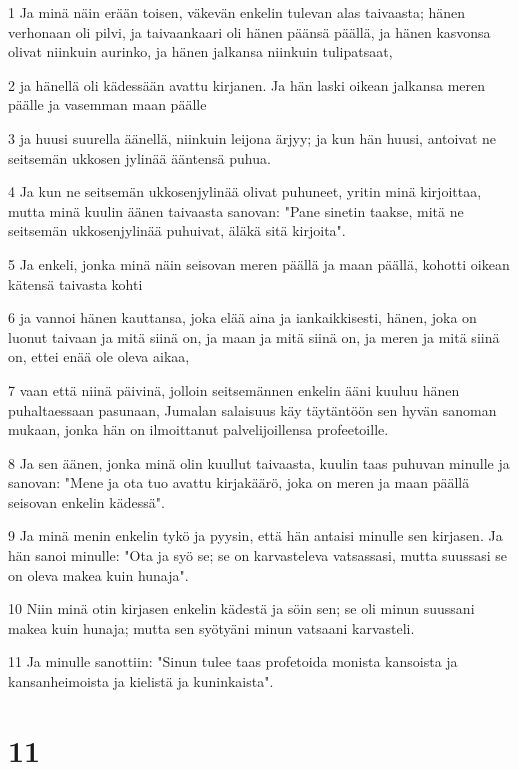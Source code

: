 \par 1 Ja minä näin erään toisen, väkevän enkelin tulevan alas taivaasta; hänen verhonaan oli pilvi, ja taivaankaari oli hänen päänsä päällä, ja hänen kasvonsa olivat niinkuin aurinko, ja hänen jalkansa niinkuin tulipatsaat,
\par 2 ja hänellä oli kädessään avattu kirjanen. Ja hän laski oikean jalkansa meren päälle ja vasemman maan päälle
\par 3 ja huusi suurella äänellä, niinkuin leijona ärjyy; ja kun hän huusi, antoivat ne seitsemän ukkosen jylinää ääntensä puhua.
\par 4 Ja kun ne seitsemän ukkosenjylinää olivat puhuneet, yritin minä kirjoittaa, mutta minä kuulin äänen taivaasta sanovan: "Pane sinetin taakse, mitä ne seitsemän ukkosenjylinää puhuivat, äläkä sitä kirjoita".
\par 5 Ja enkeli, jonka minä näin seisovan meren päällä ja maan päällä, kohotti oikean kätensä taivasta kohti
\par 6 ja vannoi hänen kauttansa, joka elää aina ja iankaikkisesti, hänen, joka on luonut taivaan ja mitä siinä on, ja maan ja mitä siinä on, ja meren ja mitä siinä on, ettei enää ole oleva aikaa,
\par 7 vaan että niinä päivinä, jolloin seitsemännen enkelin ääni kuuluu hänen puhaltaessaan pasunaan, Jumalan salaisuus käy täytäntöön sen hyvän sanoman mukaan, jonka hän on ilmoittanut palvelijoillensa profeetoille.
\par 8 Ja sen äänen, jonka minä olin kuullut taivaasta, kuulin taas puhuvan minulle ja sanovan: "Mene ja ota tuo avattu kirjakäärö, joka on meren ja maan päällä seisovan enkelin kädessä".
\par 9 Ja minä menin enkelin tykö ja pyysin, että hän antaisi minulle sen kirjasen. Ja hän sanoi minulle: "Ota ja syö se; se on karvasteleva vatsassasi, mutta suussasi se on oleva makea kuin hunaja".
\par 10 Niin minä otin kirjasen enkelin kädestä ja söin sen; se oli minun suussani makea kuin hunaja; mutta sen syötyäni minun vatsaani karvasteli.
\par 11 Ja minulle sanottiin: "Sinun tulee taas profetoida monista kansoista ja kansanheimoista ja kielistä ja kuninkaista".

\chapter{11}

